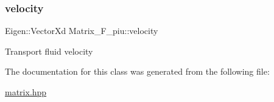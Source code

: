 \subsubsection{\texorpdfstring{velocity}{velocity}}
{\footnotesize\ttfamily Eigen\+::\+Vector\+Xd Matrix\+\_\+\+F\+\_\+piu\+::velocity\hspace{0.3cm}{\ttfamily [private]}}

Transport fluid velocity 

The documentation for this class was generated from the following file\+:\begin{DoxyCompactItemize}
\item 
\hyperlink{matrix_8hpp}{matrix.\+hpp}\end{DoxyCompactItemize}
